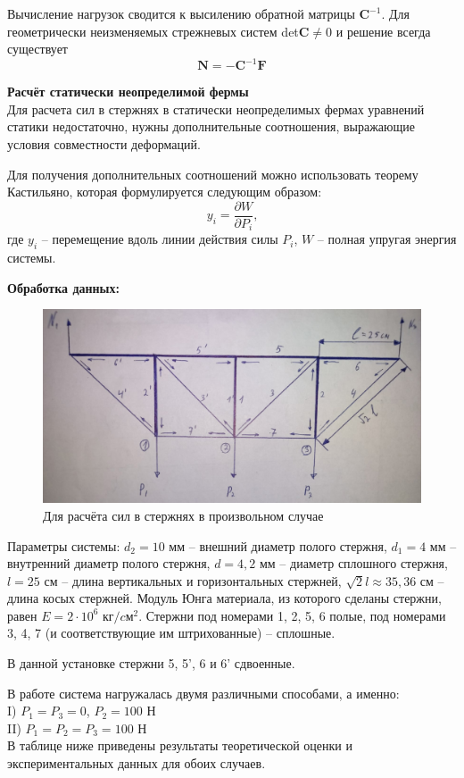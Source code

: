 \documentclass[a4paper,12pt]{article}
\begin{document}
Вычисление нагрузок сводится к высилению обратной матрицы $\mathbf{C}^{-1}$. Для геометрически неизменяемых стрежневых систем det$\mathbf{C} \neq 0$  и решение всегда существует
\[\mathbf{N} = -\mathbf{C}^{-1}\mathbf{F}\]

\textbf{Расчёт статически неопределимой фермы}\\
 Для расчета сил в стержнях в статически неопределимых фермах уравнений статики недостаточно, нужны дополнительные соотношения, выражающие условия совместности деформаций.

 Для получения дополнительных соотношений можно использовать теорему Кастильяно, которая формулируется следующим образом:
\[y_i = \frac{\partial W}{\partial P_i} \text{,}\]
где $y_i$ -- перемещение вдоль линии действия силы $P_i$, $W$ -- полная упругая энергия системы.

\textbf{Обработка данных:} 
\begin{figure}[H]\label{fig: Ustanovka}
    \centering
    \includegraphics[width = \textwidth]{Ферма.png}
    \caption{Для расчёта сил в стержнях в произвольном случае}
\end{figure}

Параметры системы: $d_2 = 10$ мм -- внешний диаметр полого стержня,  $d_1 = 4$ мм -- внутренний диаметр полого стержня, $d = 4,2$ мм -- диаметр сплошного стержня, $l = 25$ см -- длина вертикальных и горизонтальных стержней, $\sqrt{2} l \approx 35,36$ см -- длина косых стержней. Модуль Юнга материала, из которого сделаны стержни, равен $E = 2 \cdot 10^{6}$ $кг/cм^2$. Стержни под номерами 1, 2, 5, 6 полые, под номерами 3, 4, 7 (и соответствующие им штрихованные) -- сплошные.

В данной установке стержни 5, 5', 6 и 6' сдвоенные.

В работе система нагружалась двумя различными способами, а именно: \\
I) $P_1 = P_3 = 0$, $P_2 = 100$ Н \\
II) $P_1 = P_2 = P_3 = 100$ Н \\
В таблице ниже приведены результаты теоретической оценки и экспериментальных данных для обоих случаев. 
\end{document}
